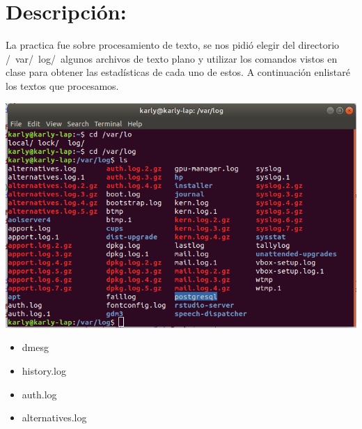 \documentclass[a4paper, 11pt, oneside]{article}
\begin{document}
\section*{Descripción:}
La practica fue sobre procesamiento de texto, se nos pidió elegir del directorio /\ var/\ log/\ algunos archivos de texto plano y utilizar los comandos vistos en clase para obtener las estadísticas de cada uno de estos. A continuación enlistaré los textos que procesamos.
\begin{center}
 \includegraphics[scale=0.30]{1.png}
\end{center}

\begin{itemize}
 \item dmesg
 \item history.log
 \item auth.log
 \item alternatives.log
\end{itemize}
\end{document}
